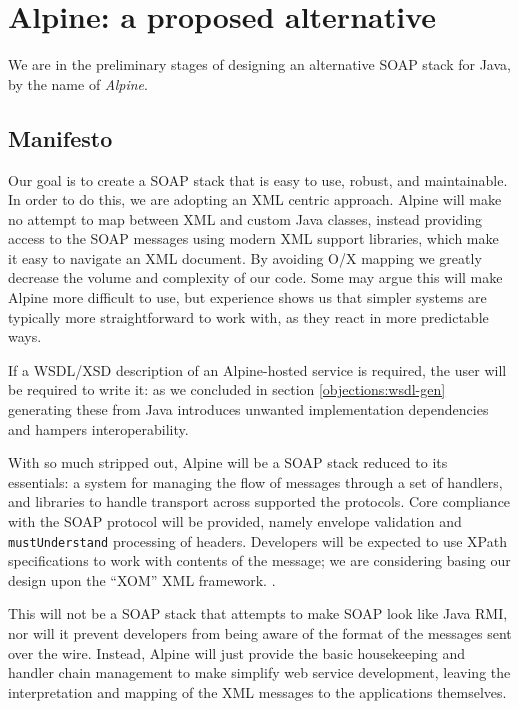 \section{Alpine: a proposed alternative}
\label{alpine}

We are in the preliminary stages of designing an alternative SOAP
stack for Java, by the name of \emph{Alpine}.

\subsection{Manifesto}
\label{alpine:manifesto}

Our goal is to create a SOAP stack that is easy to use, robust, and
maintainable. In order to do this, we are adopting an XML centric
approach. Alpine will make no attempt to map between XML and custom
Java classes, instead providing access to the SOAP messages using
modern XML support libraries, which make it easy to navigate an XML
document. By avoiding O/X mapping we greatly decrease the volume and
complexity of our code. Some may argue this will make Alpine more
difficult to use, but experience shows us that simpler systems are
typically more straightforward to work with, as they react in more
predictable ways.

If a WSDL/XSD description of an Alpine-hosted service is required, the
user will be required to write it: as we concluded in section
\ref{objections:wsdl-gen} generating these from Java introduces
unwanted implementation dependencies and hampers interoperability.

With so much stripped out, Alpine will be a SOAP stack reduced to its
essentials: a system for managing the flow of messages through a set
of handlers, and libraries to handle transport across supported the
protocols. Core compliance with the SOAP protocol will be provided,
namely envelope validation and \verb|mustUnderstand| processing of
headers. Developers will be expected to use XPath specifications to
work with contents of the message; we are considering basing our
design upon the ``XOM'' XML framework.  \cite{harold:xom}.

This will not be a SOAP stack that attempts to make SOAP look like
Java RMI, nor will it prevent developers from being aware of the
format of the messages sent over the wire. Instead, Alpine will just
provide the basic housekeeping and handler chain management to make
simplify web service development, leaving the interpretation and
mapping of the XML messages to the applications themselves.


